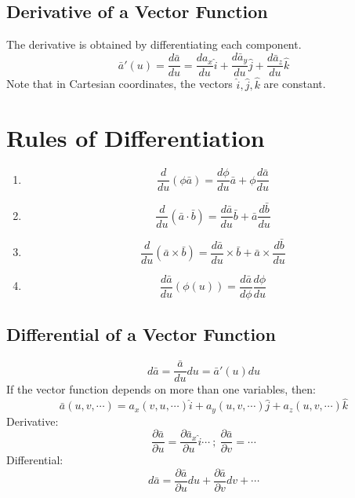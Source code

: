 \documentclass[a4paper, 11pt, normalem]{report}
\newcommand\p{\partial}
\begin{document}
\subsection{Derivative of a Vector Function}
The derivative is obtained by differentiating each component.
\begin{equation*}
    \bar{a}'(u) = \frac{d\bar{a}}{du} = \frac{da_x}{du}\hat{i} + \frac{d\bar{a}_y}{du}\hat{j} + \frac{d\bar{a}_z}{du}\hat{k}
\end{equation*}
Note that in Cartesian coordinates, the vectors $\hat{i}, \hat{j}, \hat{k}$ are constant.

\section{Rules of Differentiation}
\begin{enumerate}
    \item   \begin{equation*}
                \frac{d}{du}(\phi \bar{a}) = \frac{d\phi}{du}\bar{a} + \phi \frac{d\bar{a}}{du}
            \end{equation*}
    \item   \begin{equation*}
                \frac{d}{du}(\bar{a} \cdot \bar{b}) = \frac{d\bar{a}}{du}\bar{b} + \bar{a}\frac{d\bar{b}}{du}
            \end{equation*}
    \item   \begin{equation*}
                \frac{d}{du}(\bar{a} \times \bar{b}) = \frac{d\bar{a}}{du} \times \bar{b} + \bar{a} \times \frac{d\bar{b}}{du}
            \end{equation*}
    \item   \begin{equation*}
                \frac{d\bar{a}}{du}(\phi(u)) = \frac{d\bar{a}}{d\phi}\frac{d\phi}{du}
            \end{equation*}
\end{enumerate}

\subsection{Differential of a Vector Function}
\begin{equation*}
    d\bar{a} = \frac{\bar{a}}{du}du = \bar{a}'(u)du
\end{equation*}
If the vector function depends on more than one variables, then:
\begin{equation*}
    \bar{a}(u,v,\cdots) = a_x (v, u, \cdots) \hat{i} + a_y (u, v, \cdots) \hat{j} + a_z (u, v, \cdots)\hat{k}
\end{equation*}
Derivative:
\begin{equation*}
    \frac{\p \bar{a}}{\p u} = \frac{\p \bar{a}_x}{\p u}\hat{i} \cdots ~;~ \frac{\p \bar{a}}{\p v} = \cdots
\end{equation*}
Differential:
\begin{equation*}
    d\bar{a} = \frac{\p \bar{a}}{\p u} du + \frac{\p \bar{a}}{\p v}dv + \cdots
\end{equation*}
\end{document}
